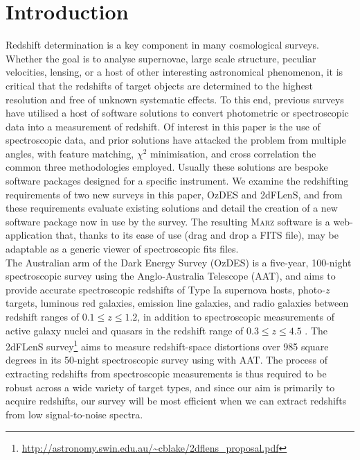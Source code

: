 \documentclass[5p]{elsarticle}
\newcommand{\red}{\color{red}}
\newcommand{\marz}{\textsc{Marz}}
\begin{document}
\linenumbers


\section{Introduction}


Redshift determination is a key component in many cosmological surveys. Whether the goal is to analyse supernovae, large scale structure, peculiar velocities, lensing, or a host of other interesting astronomical phenomenon, it is critical that the redshifts of target objects are determined to the highest resolution and free of unknown systematic effects. To this end, previous surveys have utilised a host of software solutions to convert photometric or spectroscopic data into a measurement of redshift. Of interest in this paper is the use of spectroscopic data, and prior solutions have attacked the problem from multiple angles, with feature matching, $\chi^2$ minimisation, and cross correlation the common three methodologies employed.  Usually these solutions are bespoke software packages designed for a specific instrument.  We examine the redshifting requirements of two new surveys in this paper, OzDES and 2dFLenS, and from these requirements evaluate existing solutions and detail the creation of a new software package now in use by the survey. The resulting \marz{} software is a web-application that, thanks to its ease of use (drag and drop a FITS file), may be adaptable as a generic viewer of spectroscopic fits files.\\ %


The Australian arm of the Dark Energy Survey (OzDES) is a five-year, 100-night spectroscopic survey using the Anglo-Australia Telescope (AAT), and aims to provide accurate spectroscopic redshifts of Type Ia supernova hosts, photo-$z$ targets, luminous red galaxies, emission line galaxies, and radio galaxies between redshift ranges of $0.1 \leq  z \leq 1.2$, in addition to spectroscopic measurements of active galaxy nuclei and quasars in the redshift range of $0.3 \leq z \leq 4.5$ \citep{fang2015}. The 2dFLenS survey\footnote{\url{http://astronomy.swin.edu.au/~cblake/2dflens_proposal.pdf}} aims to measure redshift-space distortions over 985 square degrees in its 50-night spectroscopic survey using with AAT.  The process of extracting redshifts from spectroscopic measurements is thus required to be robust across a wide variety of target types, and since our aim is primarily to acquire redshifts, our survey will be most efficient when we can extract redshifts from low signal-to-noise spectra.
\end{document}

